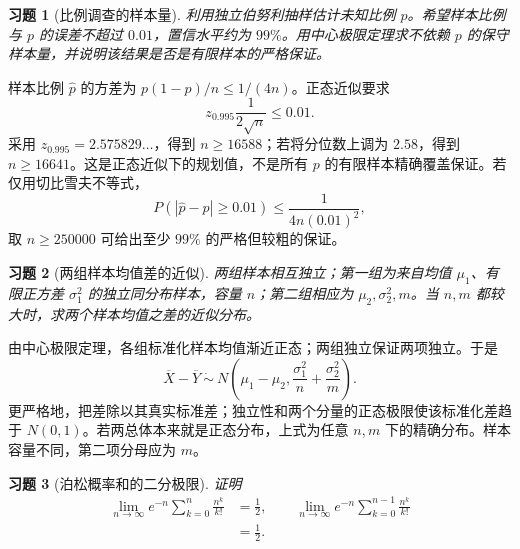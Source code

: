 \documentclass[UTF8,12pt,a4paper,fontset=fandol]{ctexart}
\newtheorem{exercise}{习题}[section]
\begin{document}
\begin{exercise}[比例调查的样本量]\label{q:A7.14}
利用独立伯努利抽样估计未知比例 $p$。希望样本比例与 $p$ 的误差不超过 $0.01$，置信水平约为 $99\%$。用中心极限定理求不依赖 $p$ 的保守样本量，并说明该结果是否是有限样本的严格保证。\par{}
\end{exercise}

\begin{solve}\label{a:A7.14}样本比例 $\widehat p$ 的方差为 $p(1-p)/n\le1/(4n)$。正态近似要求\[z_{0.995}\frac{1}{2\sqrt n}\le0.01.\]采用 $z_{0.995}=2.575829\ldots$，得到 $n\ge16588$；若将分位数上调为 $2.58$，得到 $n\ge16641$。这是正态近似下的规划值，不是所有 $p$ 的有限样本精确覆盖保证。若仅用切比雪夫不等式，\[P(|\widehat p-p|\ge0.01)\le\frac{1}{4n(0.01)^2},\]取 $n\ge250000$ 可给出至少 $99\%$ 的严格但较粗的保证。\end{solve}

\begin{exercise}[两组样本均值差的近似]\label{q:A7.15}
两组样本相互独立；第一组为来自均值 $\mu_1$、有限正方差 $\sigma_1^2$ 的独立同分布样本，容量 $n$；第二组相应为 $\mu_2,\sigma_2^2,m$。当 $n,m$ 都较大时，求两个样本均值之差的近似分布。\par{}
\end{exercise}

\begin{solve}\label{a:A7.15}由中心极限定理，各组标准化样本均值渐近正态；两组独立保证两项独立。于是\[\overline X-\overline Y\ \dot\sim\ N\left(\mu_1-\mu_2,\frac{\sigma_1^2}{n}+\frac{\sigma_2^2}{m}\right).\]更严格地，把差除以其真实标准差；独立性和两个分量的正态极限使该标准化差趋于 $N(0,1)$。若两总体本来就是正态分布，上式为任意 $n,m$ 下的精确分布。样本容量不同，第二项分母应为 $m$。\end{solve}

\begin{exercise}[泊松概率和的二分极限]\label{q:A7.20}
证明\[\begin{aligned}\lim_{n\to\infty}e^{-n}\sum_{k=0}^{n}\frac{n^k}{k!}&=\frac12,\qquad\lim_{n\to\infty}e^{-n}\sum_{k=0}^{n-1}\frac{n^k}{k!}\\&=\frac12.\end{aligned}\]\par{}
\end{exercise}
\end{document}
